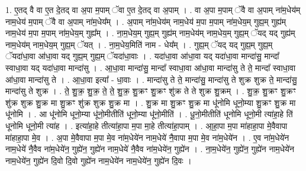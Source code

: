 \documentclass[17pt]{extarticle}
\begin{document}
1. ए॒तद् वै वा ए॒त दे॒तद् वा अ॒पा म॒पाम् ॅवा ए॒त दे॒तद् वा अ॒पाम् । . वा अ॒पा म॒पाम् ॅवै वा अ॒पाम् ना॑म॒धेय॑म् नाम॒धेय॑ म॒पाम् ॅवै वा अ॒पाम् ना॑म॒धेय᳚म् । . अ॒पाम् ना॑म॒धेय॑म् नाम॒धेय॑ म॒पा म॒पाम् ना॑म॒धेय॒म् गुह्य॒म् गुह्य॑म् नाम॒धेय॑ म॒पा म॒पाम् ना॑म॒धेय॒म् गुह्य᳚म् । . ना॒म॒धेय॒म् गुह्य॒म् गुह्य॑म् नाम॒धेय॑म् नाम॒धेय॒म् गुह्य॒म् ॅयद् यद् गुह्य॑म् नाम॒धेय॑म् नाम॒धेय॒म् गुह्य॒म् ॅयत् । . ना॒म॒धेय॒मिति॑ नाम - धेय᳚म् । . गुह्य॒म् ॅयद् यद् गुह्य॒म् गुह्य॒म् ॅयदा॑धा॒वा आ॑धा॒वा यद् गुह्य॒म् गुह्य॒म् ॅयदा॑धा॒वाः । . यदा॑धा॒वा आ॑धा॒वा यद् यदा॑धा॒वा मान्दा॑सु॒ मान्दा᳚ स्वाधा॒वा यद् यदा॑धा॒वा मान्दा॑सु । . आ॒धा॒वा मान्दा॑सु॒ मान्दा᳚ स्वाधा॒वा आ॑धा॒वा मान्दा॑सु ते ते॒ मान्दा᳚ स्वाधा॒वा आ॑धा॒वा मान्दा॑सु ते । . आ॒धा॒वा इत्या᳚ - धा॒वाः । . मान्दा॑सु ते ते॒ मान्दा॑सु॒ मान्दा॑सु ते शुक्र शुक्र ते॒ मान्दा॑सु॒ मान्दा॑सु ते शुक्र । . ते॒ शु॒क्र॒ शु॒क्र॒ ते॒ ते॒ शु॒क्र॒ शु॒क्रꣳ शु॒क्रꣳ शु॑क्र ते ते शुक्र शु॒क्रम् । . शु॒क्र॒ शु॒क्रꣳ शु॒क्रꣳ शु॑क्र शुक्र शु॒क्र मा शु॒क्रꣳ शु॑क्र शुक्र शु॒क्र मा । . शु॒क्र मा शु॒क्रꣳ शु॒क्र मा धू॑नोमि धूनो॒म्या शु॒क्रꣳ शु॒क्र मा धू॑नोमि । . आ धू॑नोमि धूनो॒म्या धू॑नो॒मीतीति॑ धूनो॒म्या धू॑नो॒मीति॑ । . धू॒नो॒मीतीति॑ धूनोमि धूनो॒मी त्या॑हा॒हे ति॑ धूनोमि धूनो॒मी त्या॑ह । . इत्या॑हा॒हे तीत्या॑हा॒पा म॒पा मा॒हे तीत्या॑हा॒पाम् । . आ॒हा॒पा म॒पा मा॑हाहा॒पा मे॒वैवापा मा॑हाहा॒पा मे॒व । . अ॒पा मे॒वैवापा म॒पा मे॒व ना॑म॒धेये॑न नाम॒धेये॑ नै॒वापा म॒पा मे॒व ना॑म॒धेये॑न । . ए॒व ना॑म॒धेये॑न नाम॒धेये॑ नै॒वैव ना॑म॒धेये॑न॒ गुह्ये॑न॒ गुह्ये॑न नाम॒धेये॑ नै॒वैव ना॑म॒धेये॑न॒ गुह्ये॑न । . ना॒म॒धेये॑न॒ गुह्ये॑न॒ गुह्ये॑न नाम॒धेये॑न नाम॒धेये॑न॒ गुह्ये॑न दि॒वो दि॒वो गुह्ये॑न नाम॒धेये॑न नाम॒धेये॑न॒ गुह्ये॑न दि॒वः । \newline
\end{document}

